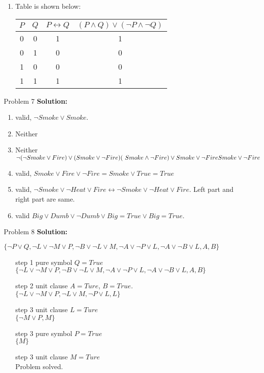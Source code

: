 \normalfont\documentclass[letterpaper,11pt]{article}
\begin{document}
\begin{enumerate}
\begin{enumerate}
		\item Table is shown below:\par
		\begin{tabular}{c|c|c|c}
			\hline
			$P$ & $Q$ & $P \leftrightarrow Q$ & $ (P \land Q)\lor(\neg P \land \neg Q)$ \\
			\hline
			0 & 0 & 1 & 1 \\
			0 & 1 & 0 & 0 \\
			1 & 0 & 0 & 0 \\
			1 & 1 & 1 & 1 \\
		\end{tabular}
	\end{enumerate}
\item[Problem 7]\textbf{Solution:}\par
	\begin{enumerate}
		\item valid, $\neg Smoke \lor Smoke$.
		\item Neither
		\item Neither
			$\neg(\neg Smoke \lor Fire)\lor(Smoke\lor \neg Fire) \\ (\ Smoke \land \neg Fire)\lor Smoke\lor \neg Fire\\Smoke\lor \neg Fire$\\
		 
		\item valid, $Smoke \lor Fire \lor \neg Fire = Smoke \lor True = True$
		\item valid, $\neg Smoke \lor \neg Heat \lor Fire \leftrightarrow \neg Smoke \lor \neg Heat \lor Fire$. Left part and right part are same.
		\item valid $Big \lor Dumb \lor \neg Dumb \lor Big = True \lor Big = True$.
	\end{enumerate}
\item[Problem 8]\textbf{Solution:}\par
	$\{\neg P \lor Q, \neg L \lor \neg M \lor P, \neg B \lor \neg L \lor M, \neg A\lor \neg P \lor L,\neg A \lor \neg B \lor L, A, B\}$\\
	\begin{enumerate}
		\item[step 1] 
			pure symbol $Q = True$\\			
			$\{\neg L \lor \neg M \lor P, \neg B \lor \neg L \lor M, \neg A\lor \neg P \lor L,\neg A \lor \neg B \lor L, A, B\}$\\
		\item[step 2]
			unit clause $A = Ture$, $B = True$.\\
			$\{\neg L \lor \neg M \lor P, \neg L \lor M, \neg P \lor L, L\}$\\
		\item[step 3]
			unit clause $L = Ture$\\
			$\{\neg M \lor P, M\}$\\
		\item[step 3]
			pure symbol $P = True$\\
			$\{M\}$\\
		\item[step 3]
			unit clause $M = Ture$	\\
		Problem solved.
	\end{enumerate}
\end{enumerate}
\end{document}

